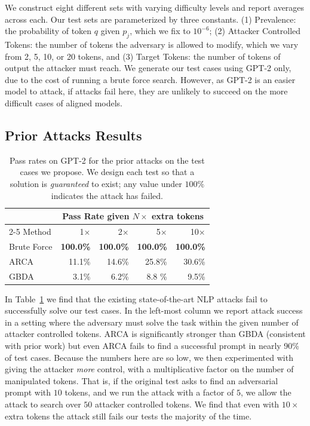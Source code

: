 \documentclass{article}
\begin{document}
We construct eight different sets with varying difficulty levels and report averages across each.
%
Our test sets are parameterized by three constants.
(1) Prevalence: the probability of token $q$ given $p_j$, which we fix to $10^{-6}$;
(2) Attacker Controlled Tokens: the number of tokens the adversary is allowed to modify, which we vary from 2, 5, 10, or 20 tokens,
and (3) Target Tokens: the number of tokens of output the attacker must reach. 
We generate our test cases using GPT-2 only, due to the cost of running a brute force search. However, as GPT-2 is an easier model to attack, if attacks fail here, they are unlikely to succeed on the more difficult cases of aligned models.


\subsection{Prior Attacks Results}

\begin{table}
  \centering
  \caption{Pass rates on GPT-2 for the prior attacks on the test cases we propose. We design each test so that a solution is \emph{guaranteed} to exist; any value under $100\%$ indicates the attack has failed.}
  \label{tab:pass-rates-avg}
  \begin{tabular}{@{}lrrrr@{}}
    \toprule
     & \multicolumn{4}{c}{Pass Rate given $N\times$ extra tokens}  \\
    \cmidrule(lr){2-5}
    Method & 1$\times$ & 2$\times$ & 5$\times$ & 10$\times$ \\
    \midrule
    Brute Force & \textbf{100.0\%} & \textbf{100.0\%} & \textbf{100.0\%} & \textbf{100.0\%} \\
    ARCA & 11.1\% & 14.6\% & 25.8\% & 30.6\% \\
    GBDA & 3.1\% & 6.2\% & 8.8 \% & 9.5\% \\
    \bottomrule
  \end{tabular}
\end{table}

In Table~\ref{tab:pass-rates-avg} we find that the existing state-of-the-art NLP attacks
fail to successfully solve our test cases. 
In the left-most column we report attack success in a setting where the
adversary must solve the task within the given number of attacker controlled tokens.
%
ARCA is significantly stronger than GBDA (consistent with prior work) but even ARCA
fails to find a successful prompt in nearly 90\% of test cases.
%
Because the numbers here are so low, we then experimented with giving the
attacker \emph{more} control, with a multiplicative factor on the number of
manipulated tokens.
%
That is, if the original test asks to find an adversarial prompt with
$10$ tokens, and we run the attack with a factor of $5$, we allow
the attack to search over $50$ attacker controlled tokens.
%
We find that even with $10\times$ extra tokens the attack still
fails our tests the majority of the time.
\end{document}
